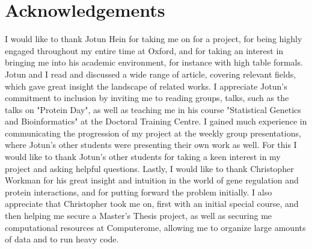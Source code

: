 \section*{Acknowledgements}

I would like to thank Jotun Hein for taking me on for a project, for being highly engaged throughout my entire time at Oxford, and for taking an interest in bringing me into his academic environment, for instance with high table formals. Jotun and I read and discussed a wide range of article, covering relevant fields, which gave great insight the landscape of related works. I appreciate Jotun's commitment to inclusion by inviting me to reading groups, talks, such as the talks on "Protein Day", as well as teaching me in his course "Statistical Genetics and Bioinformatics" at the Doctoral Training Centre.
I gained much experience in communicating the progression of my project at the weekly group presentations, where Jotun's other students were presenting their own work as well. For this I would like to thank Jotun's other students for taking a keen interest in my project and asking helpful questions. Lastly, I would like to thank Christopher Workman for his great insight and intuition in the world of gene regulation and protein interactions, and for putting forward the problem initially. I also appreciate that Christopher took me on, first with an initial special course, and then helping me secure a Master's Thesis project, as well as securing me computational resources at Computerome, allowing me to organize large amounts of data and to run heavy code.



\newpage